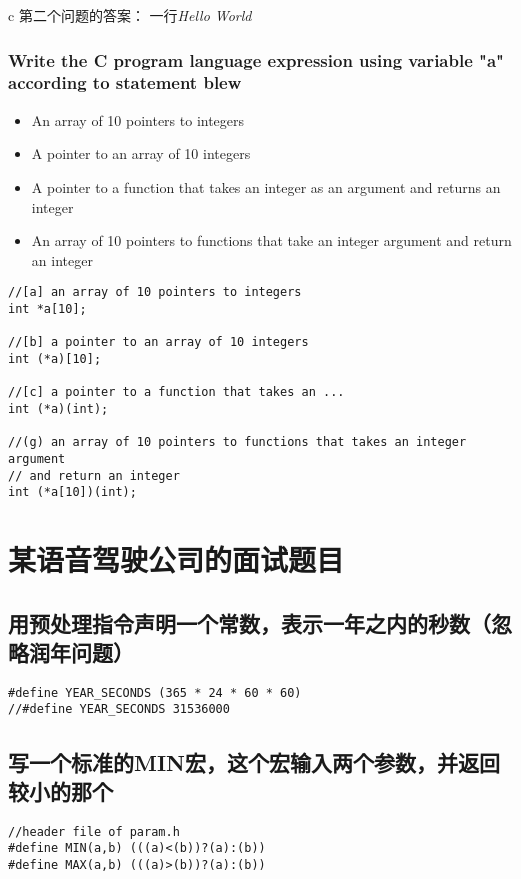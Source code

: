 \documentclass{article}
\begin{document}
\begin{mitned}{c}
第二个问题的答案： 一行\textit{Hello World}

\subsubsection{Write the C program language expression using variable "a" according to statement blew}
\begin{itemize}
\item[(a)] An array of 10 pointers to integers
\item[(b)] A pointer to an array of 10 integers
\item[(c)] A pointer to a function that takes an integer as an argument and returns an integer
\item[(d)] An array of 10 pointers to functions that take an integer argument and return an integer
\end{itemize}
\begin{verbatim}
//[a] an array of 10 pointers to integers
int *a[10];

//[b] a pointer to an array of 10 integers
int (*a)[10];

//[c] a pointer to a function that takes an ...
int (*a)(int);

//(g) an array of 10 pointers to functions that takes an integer argument
// and return an integer
int (*a[10])(int);
\end{verbatim}

\section{某语音驾驶公司的面试题目}
\subsection{用预处理指令声明一个常数，表示一年之内的秒数（忽略润年问题）}
\begin{verbatim}
#define YEAR_SECONDS (365 * 24 * 60 * 60)
//#define YEAR_SECONDS 31536000
\end{verbatim}

\subsection{写一个标准的MIN宏，这个宏输入两个参数，并返回较小的那个}
\begin{verbatim}
//header file of param.h
#define MIN(a,b) (((a)<(b))?(a):(b))
#define MAX(a,b) (((a)>(b))?(a):(b))

\end{verbatim}


\end{mitned}
\end{document}
